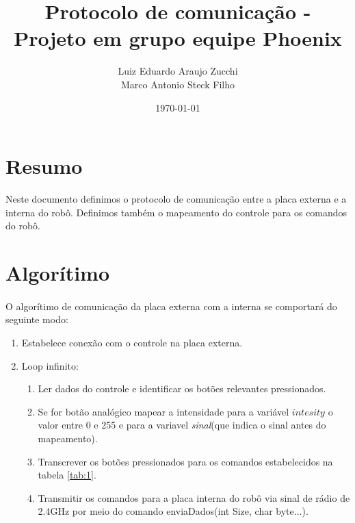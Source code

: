 \documentclass{article}
\title{Protocolo de comunicação - Projeto em grupo equipe Phoenix}
\author{
    Luiz Eduardo Araujo Zucchi\\
    Marco Antonio Steck Filho
}
\date{\today}
\begin{document}
    \maketitle
    \newpage

    \section{Resumo}
        Neste documento definimos o protocolo de comunicação entre a placa externa e a interna do robô. Definimos também o mapeamento do controle para os comandos do robô.

    \section{Algorítimo}
        \label{sec:1}
        \paragraph{}
        O algorítimo de comunicação da placa externa com a interna se comportará do seguinte modo:
        \begin{enumerate}
            \item Estabelece conexão com o controle na placa externa.
            \item Loop infinito:
            \begin{enumerate}
                \item Ler dados do controle e identificar os botões relevantes pressionados.
                \item Se for botão analógico mapear a intensidade para a variável $\textit{intesity}$ o valor entre 0 e 255 e para a variavel \textit{sinal}(que indica o sinal antes do mapeamento).
                \item Transcrever os botões pressionados para os comandos estabelecidos na tabela \ref{tab:1}.
                \item Transmitir os comandos para a placa interna do robô via sinal de rádio de 2.4GHz por meio do comando enviaDados(int Size, char byte...).
            \end{enumerate}
        \end{enumerate}
\end{document}
